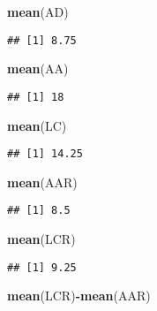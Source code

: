 \documentclass[
]{article}
\newenvironment{Shaded}{\begin{snugshade}}{\end{snugshade}}
\newcommand{\FunctionTok}[1]{\textcolor[rgb]{0.13,0.29,0.53}{\textbf{#1}}}
\newcommand{\NormalTok}[1]{#1}
\newcommand{\SpecialCharTok}[1]{\textcolor[rgb]{0.81,0.36,0.00}{\textbf{#1}}}
\begin{document}
\begin{Shaded}
\begin{Highlighting}[]
\FunctionTok{mean}\NormalTok{(AD)}
\end{Highlighting}
\end{Shaded}

\begin{verbatim}
## [1] 8.75
\end{verbatim}

\begin{Shaded}
\begin{Highlighting}[]
\FunctionTok{mean}\NormalTok{(AA)}
\end{Highlighting}
\end{Shaded}

\begin{verbatim}
## [1] 18
\end{verbatim}

\begin{Shaded}
\begin{Highlighting}[]
\FunctionTok{mean}\NormalTok{(LC)}
\end{Highlighting}
\end{Shaded}

\begin{verbatim}
## [1] 14.25
\end{verbatim}

\begin{Shaded}
\begin{Highlighting}[]
\FunctionTok{mean}\NormalTok{(AAR)}
\end{Highlighting}
\end{Shaded}

\begin{verbatim}
## [1] 8.5
\end{verbatim}

\begin{Shaded}
\begin{Highlighting}[]
\FunctionTok{mean}\NormalTok{(LCR)}
\end{Highlighting}
\end{Shaded}

\begin{verbatim}
## [1] 9.25
\end{verbatim}

\begin{Shaded}
\begin{Highlighting}[]
\FunctionTok{mean}\NormalTok{(LCR)}\SpecialCharTok{{-}}\FunctionTok{mean}\NormalTok{(AAR)}
\end{Highlighting}
\end{Shaded}
\end{document}
